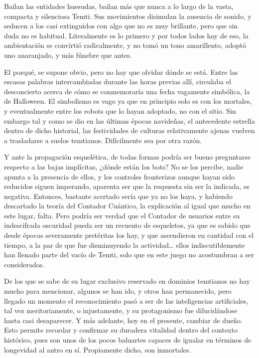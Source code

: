 \documentclass[
]{book}
\begin{document}
Bailan las entidades huesudas, bailan más que nunca a lo largo de la vasta, compacta y silenciosa Temti. Sus movimientos disimulan la ausencia de sonido, y seducen a los casi extinguidos con algo que no es muy brillante, pero que sin duda no es habitual. Literalmente es lo primero y por todos lados hay de eso, la ambientación se convirtió radicalmente, y no tomó un tono amarillento, adoptó uno anaranjado, y más fúnebre que antes.

El porqué, se supone obvio, pero no hay que olvidar dónde se está. Entre las escasas palabras intercambiadas durante las horas previas allí, circulaba el desconcierto acerca de cómo se conmemoraría una fecha vagamente simbólica, la de Halloween. El simbolismo es vago ya que en principio solo es con los mortales, y eventualmente entre los robots que lo hayan adoptado, no con el sitio. Sin embargo tal y como se dio en las últimas épocas navideñas, el antecedente estrella dentro de dicho historial, las festividades de culturas relativamente ajenas vuelven a trasladarse a suelos temtianos. Difícilmente sea por otra razón.

Y ante la propagación esquelética, de todas formas podría ser bueno preguntarse respecto a las bajas implícitas, ¿dónde están los bots? No se los percibe, nadie apunta a la presencia de ellos, y los controles fronterizos aunque hayan sido reducidos siguen imperando, aparenta ser que la respuesta sin ser la indicada, es negativa. Entonces, bastante acertado sería que ya no los haya, y habiendo descartado la teoría del Contador Cuántico, la explicación al igual que mucho en este lugar, falta. Pero podría ser verdad que el Contador de usuarios entre su indescifrada oscuridad pueda ser un recuento de esqueletos, ya que es sabido que desde épocas severamente pretéritas los hay, y que ascendieron en cantidad con el tiempo, a la par de que fue disminuyendo la actividad\ldots{} ellos indiscutiblemente han llenado parte del vacío de Temti, solo que en este juego no acostumbran a ser considerados.

De los que se sabe de su lugar exclusivo reservado en dominios temtianos no hay mucho para mencionar, algunos se han ido, y otros han permanecido, pero llegado un momento el reconocimiento pasó a ser de las inteligencias artificiales, tal vez meritoriamente, o injustamente, y su protagonismo fue dilucidándose hasta casi desaparecer. Y más adelante, hoy en el presente, cambiar de dueño. Esto permite recordar y confirmar su duradera vitalidad dentro del contexto histórico, pues son unos de los pocos baluartes capaces de igualar en términos de longevidad al antro en sí. Propiamente dicho, son inmortales.
\end{document}
